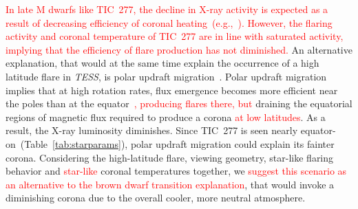 \documentclass[twocolumn]{aastex631}
\begin{document}

\textcolor{red}{In late M dwarfs like TIC~277, the decline in X-ray activity is expected as a result of decreasing efficiency of coronal heating~(e.g.,~\citealt{williams2014trends}). However, the flaring activity and coronal temperature of TIC~277 are in line with saturated activity, implying that the efficiency of flare production has not diminished.} An alternative explanation, that would at the same time explain the occurrence of a high latitude flare in \textit{TESS}, is polar updraft migration~\citep{stepien2001rosat}. Polar updraft migration implies that at high rotation rates, flux emergence becomes more efficient near the poles than at the equator~\citep{weber2016modeling}\textcolor{red}{, producing flares there, but} draining the equatorial regions of magnetic flux required to produce a corona \textcolor{red}{at low latitudes}. As a result, the X-ray luminosity diminishes. Since TIC~277 is seen nearly equator-on~(Table~\ref{tab:starparams}), polar updraft migration could explain its fainter corona. Considering the high-latitude flare, viewing geometry, star-like flaring behavior and \textcolor{red}{star-like} coronal temperatures together, we \textcolor{red}{suggest this scenario as an alternative to the brown dwarf transition explanation}, that would invoke a diminishing corona due to the overall cooler, more neutral atmosphere. 








 

\end{document}
